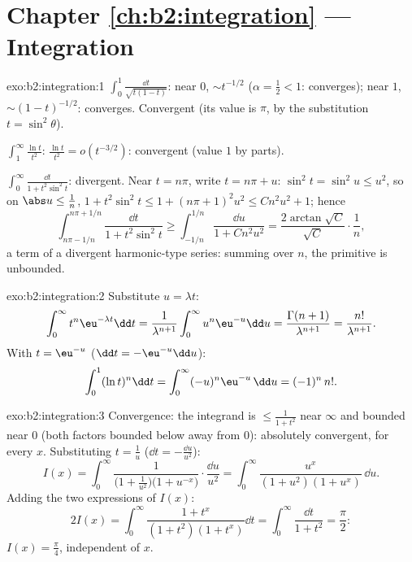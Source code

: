 \section*{Chapter \ref{ch:b2:integration} --- Integration}

\begin{solution}{exo:b2:integration:1}
$\int_0^1 \frac{\dd t}{\sqrt{t(1-t)}}$: near $0$, $\sim t^{-1/2}$
($\alpha = \frac12 < 1$: converges); near $1$, $\sim
(1-t)^{-1/2}$: converges. Convergent (its value is $\pi$, by the
substitution $t = \sin^2\theta$).

$\int_1^\infty \frac{\ln t}{t^2}$: $\frac{\ln t}{t^2} = o(t^{-3/2})$:
convergent (value $1$ by parts).

$\int_0^\infty \frac{\dd t}{1 + t^2\sin^2 t}$: divergent. Near $t =
n\pi$, write $t = n\pi + u$: $\sin^2 t = \sin^2 u \leq u^2$, so on
$\abs u \leq \frac{1}{n}$, $1 + t^2\sin^2 t \leq 1 + (n\pi +
1)^2u^2 \leq C n^2 u^2 + 1$; hence
\[
\int_{n\pi - 1/n}^{n\pi + 1/n} \frac{\dd t}{1 + t^2\sin^2 t}
\geq \int_{-1/n}^{1/n} \frac{\dd u}{1 + Cn^2u^2}
= \frac{2\arctan\sqrt C}{\sqrt C}\cdot\frac{1}{n} ,
\]
a term of a divergent harmonic-type series: summing over $n$, the
primitive is unbounded.
\end{solution}

\begin{solution}{exo:b2:integration:2}
Substitute $u = \lambda t$:
\[
\int_0^\infty t^n \eu^{-\lambda t}\dd t
= \frac{1}{\lambda^{n+1}}\int_0^\infty u^n\eu^{-u}\dd u
= \frac{\Gamma(n+1)}{\lambda^{n+1}} = \frac{n!}{\lambda^{n+1}} .
\]
With $t = \eu^{-u}$ ($\dd t = -\eu^{-u}\dd u$):
\[
\int_0^1 (\ln t)^n \dd t = \int_0^{\infty} (-u)^n \eu^{-u}\,\dd u
= (-1)^n\, n! .
\]
\end{solution}

\begin{solution}{exo:b2:integration:3}
Convergence: the integrand is $\leq \frac{1}{1+t^2}$ near $\infty$
and bounded near $0$ (both factors bounded below away from $0$):
absolutely convergent, for every $x$. Substituting $t = \frac1u$
($\dd t = -\frac{\dd u}{u^2}$):
\[
I(x) = \int_0^\infty \frac{1}{\bigl(1 +
\frac1{u^2}\bigr)\bigl(1 + u^{-x}\bigr)}\cdot\frac{\dd u}{u^2}
= \int_0^\infty \frac{u^x}{(1 + u^2)(1 + u^x)}\,\dd u .
\]
Adding the two expressions of $I(x)$:
\[
2I(x) = \int_0^\infty \frac{1 + t^x}{(1+t^2)(1+t^x)}\dd t
= \int_0^\infty \frac{\dd t}{1 + t^2} = \frac{\pi}{2} :
\]
$I(x) = \frac\pi4$, independent of $x$.
\end{solution}

